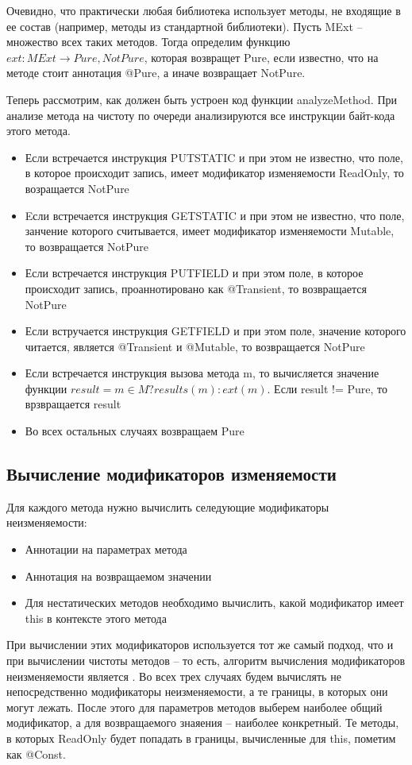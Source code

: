 Очевидно, что практически любая библиотека использует методы, не входящие в ее состав (например, методы из стандартной библиотеки). Пусть MExt -- множество всех таких методов. Тогда определим функцию $ext: MExt \rightarrow {Pure, NotPure}$, которая возвращет Pure, если известно, что на методе стоит аннотация @Pure, а иначе возвращает NotPure. 

Теперь рассмотрим, как должен быть устроен код функции analyzeMethod. При анализе метода на чистоту по очереди анализируются все инструкции байт-кода этого метода. 
\begin{itemize}
\item Если встречается инструкция PUTSTATIC и при этом не известно, что поле, в которое происходит запись, имеет модификатор изменяемости ReadOnly, то возращается NotPure
\item Eсли встречается инструкция GETSTATIC и при этом не известно, что поле, занчение которого считывается, имеет модификатор изменяемости Mutable, то возвращается NotPure
\item Если встречается инструкция PUTFIELD и при этом поле, в которое происходит запись, проаннотировано как @Transient, то возвращается NotPure
\item Если встручается инструкция GETFIELD и при этом поле, значение которого читается, является @Transient и @Mutable, то возвращается NotPure
\item Если встречается инструкция вызова метода m, то вычисляется значение функции $result = m \in M ? results(m) : ext(m)$. Если result != Pure, то врзвращается result
\item Во всех остальных случаях возвращаем Pure
\end{itemize} 

\subsection{Вычисление модификаторов изменяемости} 

Для каждого метода нужно вычислить селедующие модификаторы неизменяемости:
\begin{itemize}
    \item Аннотации на параметрах метода
    \item Аннотация на возвращаемом значении
    \item Для нестатических методов необходимо вычислить, какой модификатор имеет this в контексте этого метода
\end{itemize}

При вычислении этих модификаторов используется тот же самый подход, что и при вычислении чистоты методов -- то есть, алгоритм вычисления модификаторов неизменяемости является . Во всех трех случаях будем вычислять не непосредственно модификаторы неизменяемости, а те границы, в которых они могут лежать. После этого для параметров методов выберем наиболее общий модификатор, а для возвращаемого знаяения -- наиболее конкретный. Те методы, в которых ReadOnly будет попадать в границы, вычисленные для this, пометим как @Const.

